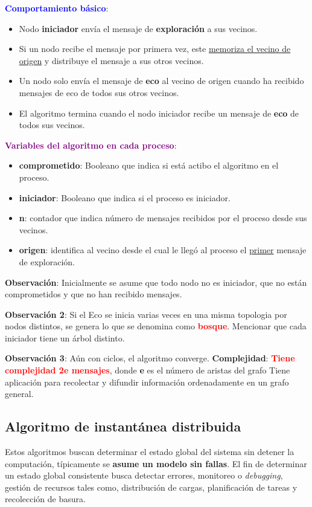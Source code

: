 \textbf{\textcolor{blue}{Comportamiento básico}}: \begin{itemize}
    \item Nodo \textbf{iniciador} envía el mensaje de \textbf{exploración} a sus vecinos.
    \item Si un nodo recibe el mensaje por primera vez, este \underline{memoriza el vecino de origen} y distribuye el mensaje a sus otros vecinos.
    \item Un nodo solo envía el mensaje de \textbf{eco} al vecino de origen cuando ha recibido mensajes de eco de todos sus otros vecinos.
    \item El algoritmo termina cuando el nodo iniciador recibe un mensaje de \textbf{eco} de todos sus vecinos.
\end{itemize}

\textbf{{\textcolor{purple}{Variables del algoritmo en cada proceso}}}: \begin{itemize}
    \item \textbf{comprometido}: Booleano que indica si está actibo el algoritmo en el proceso.
    \item \textbf{iniciador}: Booleano que indica si el proceso es iniciador.
    \item \textbf{n}: contador que indica número de mensajes recibidos por el proceso desde sus vecinos.
    \item \textbf{origen}: identifica al vecino desde el cual le llegó al proceso el \underline{primer} mensaje de exploración.
\end{itemize}

\textbf{Observación}: Inicialmente se asume que todo nodo no es iniciador, que no están comprometidos y que no han recibido mensajes.

\textbf{Observación 2}: Si el Eco se inicia varias veces en una misma topologia por nodos distintos, se genera lo que se denomina como \textcolor{red}{\textbf{bosque}}. Mencionar que cada iniciador tiene un árbol distinto.
\vspace{0.5em}

\textbf{Observación 3}: Aún con ciclos, el algoritmo converge.
\textbf{Complejidad}: \textcolor{red}{\textbf{Tiene complejidad 2e mensajes}}, donde \textbf{e} es el número de aristas del grafo
Tiene aplicación para recolectar y difundir información ordenadamente en un grafo general. 

\subsection{Algoritmo de instantánea distribuida}
Estos algoritmos buscan determinar el estado global del sistema sin detener la computación, típicamente se \textbf{asume un modelo sin fallas}. El fin de determinar un estado global consistente busca detectar errores, monitoreo o \textit{debugging}, gestión de recursos tales como, distribución de cargas, planificación de tareas y recolección de basura.

